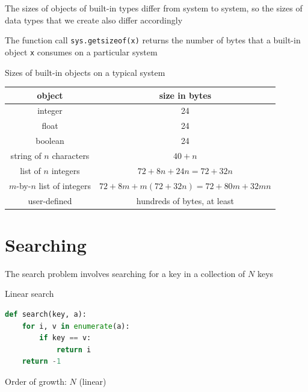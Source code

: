 \documentclass[8pt,a4paper,compress]{beamer}
\begin{document}
\begin{frame}[fragile]
\pause

The sizes of objects of built-in types differ from system to system, so the sizes of data types that we create also differ accordingly

\pause
\bigskip

The function call \lstinline{sys.getsizeof(x)} returns the number of bytes that a built-in object \lstinline{x} consumes on a particular system

\pause
\bigskip

Sizes of built-in objects on a typical system
\begin{center}
\begin{tabular}{cc}
object & size in bytes \\ \hline
integer & 24 \\ 
float & 24 \\ 
boolean & 24 \\ 
string of $n$ characters & $40 + n$ \\
list of $n$ integers & $72 + 8n + 24n = 72 + 32n$ \\
$m$-by-$n$ list of integers & $72 + 8m + m(72 + 32n) = 72 + 80m + 32mn$ \\
user-defined & hundreds of bytes, at least
\end{tabular} 
\end{center}
\end{frame}

\section{Searching}
\begin{frame}[fragile]
\pause
The search problem involves searching for a key in a collection of $N$ keys

\pause
\bigskip

Linear search
\begin{lstlisting}[language=python,style=focusin]
def search(key, a):
    for i, v in enumerate(a):
        if key == v:
            return i
    return -1
\end{lstlisting}

\pause

Order of growth: $N$ (linear)
\end{frame}
\end{document}
